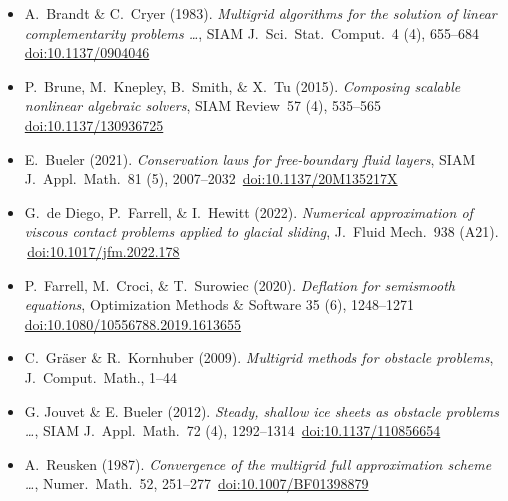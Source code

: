 
\newcommand{\sdoi}[1]{\,{\tiny \href{https://doi.org/#1}{doi:#1}}}
\begin{itemize}
\item[] A.~Brandt \& C.~Cryer (1983). \emph{Multigrid algorithms for the solution of linear complementarity problems \dots}, SIAM J.~Sci.~Stat.~Comput.~4 (4), 655--684 \sdoi{10.1137/0904046}
\item[] P.~Brune, M.~Knepley, B.~Smith, \& X.~Tu (2015). \emph{Composing scalable nonlinear algebraic solvers}, SIAM Review~57 (4), 535--565 \sdoi{10.1137/130936725}
\item[] E.~Bueler (2021). \emph{Conservation laws for free-boundary fluid layers}, SIAM J.~Appl.~Math.~81 (5), 2007--2032 \sdoi{10.1137/20M135217X}
\item[] G.~de Diego, P.~Farrell, \& I.~Hewitt (2022). \emph{Numerical approximation of viscous contact problems applied to glacial sliding}, J.~Fluid Mech.~938 (A21). \sdoi{10.1017/jfm.2022.178}
\item[] P.~Farrell, M.~Croci, \& T.~Surowiec (2020). \emph{Deflation for semismooth equations}, Optimization Methods \& Software 35 (6), 1248--1271 \sdoi{10.1080/10556788.2019.1613655}
\item[] C.~Gr{\"a}ser \& R.~Kornhuber (2009). \emph{Multigrid methods for obstacle problems}, J.~Comput.~Math., 1--44
\item[] G. Jouvet \& E. Bueler (2012). \emph{Steady, shallow ice sheets as obstacle problems \dots}, SIAM J.~Appl.~Math.~72 (4), 1292--1314 \sdoi{10.1137/110856654}
\item[] A.~Reusken (1987). \emph{Convergence of the multigrid full approximation scheme \dots}, Numer.~Math.~52, 251--277 \sdoi{10.1007/BF01398879}
\end{itemize}


